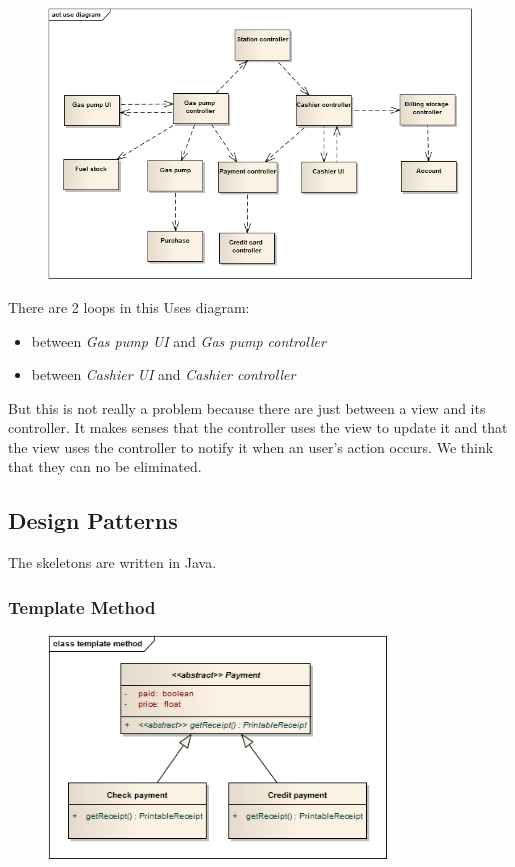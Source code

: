 \begin{figure}[H]
 \centering
 \includegraphics[width=\textwidth]{../useDiagram.png}
\end{figure}
There are 2 loops in this Uses diagram:
\begin{itemize}
	\item between \textit{Gas pump UI} and \textit{Gas pump controller}
	\item between \textit{Cashier UI} and \textit{Cashier controller}
\end{itemize}
But this is not really a problem because there are just between a view and its controller. It makes senses that the controller uses the view to update it and that the view uses the controller to notify it when an user's action occurs. We think that they can no be eliminated.


\subsection{Design Patterns}
The skeletons are written in Java.

\subsubsection{Template Method}
\begin{figure}[H]
 \centering
 \includegraphics[width=0.8\textwidth]{../templateMethod.png}
\end{figure}


